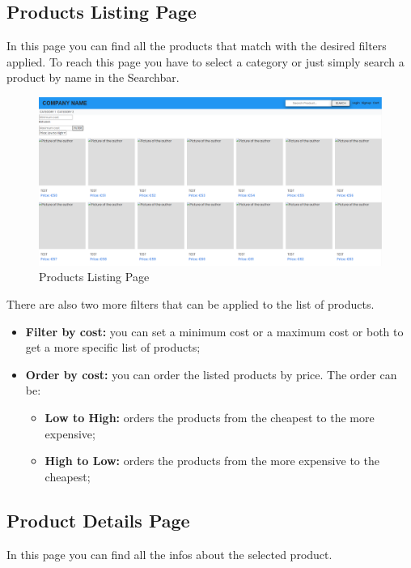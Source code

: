 \subsection{Products Listing Page}
In this page you can find all the products that match with the desired filters applied. To reach this page you have to select a category or just simply search a product by name in the Searchbar.

\begin{figure}[H]
    \centering
    \includegraphics[width=\linewidth]{res/images/cliente/plp.png}
    \caption{Products Listing Page}
\end{figure}

There are also two more filters that can be applied to the list of products.

\begin{itemize} 
    \item \textbf{Filter by cost:} you can set a minimum cost or a maximum cost or both to get a more specific list of products;
    \item \textbf{Order by cost:} you can order the listed products by price. The order can be:
    \begin{itemize}
        \item \textbf{Low to High:} orders the products from the cheapest to the more expensive;
        \item \textbf{High to Low:} orders the products from the more expensive to the cheapest;
    \end{itemize}
\end{itemize}

\subsection{Product Details Page}
In this page you can find all the infos about the selected product.

